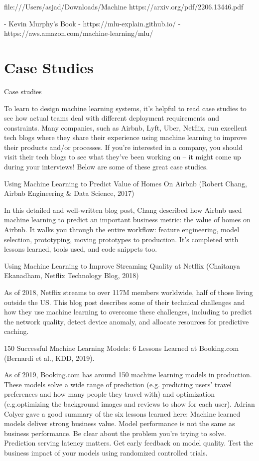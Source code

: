 \documentclass[openany]{book}
\begin{document}
file:///Users/asjad/Downloads/Machine%
https://arxiv.org/pdf/2206.13446.pdf

- Kevin Murphy's Book 
- https://mlu-explain.github.io/ 
- https://aws.amazon.com/machine-learning/mlu/


\chapter{Case Studies}


Case studies

To learn to design machine learning systems, it's helpful to read case studies to see how actual teams deal with different deployment requirements and constraints. Many companies, such as Airbnb, Lyft, Uber, Netflix, run excellent tech blogs where they share their experience using machine learning to improve their products and/or processes. If you're interested in a company, you should visit their tech blogs to see what they've been working on -- it might come up during your interviews! Below are some of these great case studies.

    Using Machine Learning to Predict Value of Homes On Airbnb (Robert Chang, Airbnb Engineering & Data Science, 2017)

    In this detailed and well-written blog post, Chang described how Airbnb used machine learning to predict an important business metric: the value of homes on Airbnb. It walks you through the entire workflow: feature engineering, model selection, prototyping, moving prototypes to production. It's completed with lessons learned, tools used, and code snippets too.

    Using Machine Learning to Improve Streaming Quality at Netflix (Chaitanya Ekanadham, Netflix Technology Blog, 2018)

    As of 2018, Netflix streams to over 117M members worldwide, half of those living outside the US. This blog post describes some of their technical challenges and how they use machine learning to overcome these challenges, including to predict the network quality, detect device anomaly, and allocate resources for predictive caching.

    150 Successful Machine Learning Models: 6 Lessons Learned at Booking.com (Bernardi et al., KDD, 2019).

    As of 2019, Booking.com has around 150 machine learning models in production. These models solve a wide range of prediction (e.g. predicting users' travel preferences and how many people they travel with) and optimization (e.g.optimizing the background images and reviews to show for each user). Adrian Colyer gave a good summary of the six lessons learned here:
        Machine learned models deliver strong business value.
        Model performance is not the same as business performance.
        Be clear about the problem you're trying to solve.
        Prediction serving latency matters.
        Get early feedback on model quality.
        Test the business impact of your models using randomized controlled trials.
\end{document}
